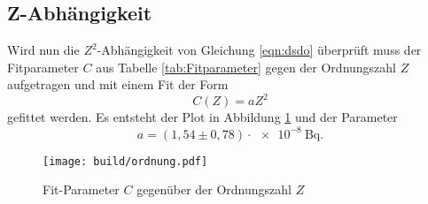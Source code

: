 \subsection{Z-Abhängigkeit}
Wird nun die $Z^2$-Abhängigkeit von Gleichung \eqref{eqn:dsdo} überprüft muss der Fitparameter $C$ aus Tabelle \ref{tab:Fitparameter}
gegen der Ordnungszahl $Z$ aufgetragen und mit einem Fit der Form
\begin{equation}
  C(Z) = aZ^2
\end{equation}
gefittet werden.
Es entsteht der Plot in Abbildung \ref{fig:ordnung} und der Parameter
\begin{equation}
  a = (1,54 \pm 0,78)\cdot\SI{e-8}{\becquerel}.
\end{equation}
\begin{figure}
  \centering
  \texttt{[image: build/ordnung.pdf]}
  \caption{Fit-Parameter $C$ gegenüber der Ordnungszahl $Z$}
  \label{fig:ordnung}
\end{figure}